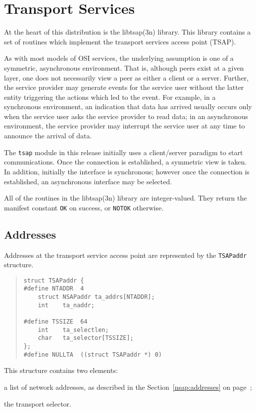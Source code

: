 
\chapter	{Transport Services}\label{libtsap}
At the heart of this distribution is the \man libtsap(3n) library.
This library contains a set of routines which implement the
transport services access point (TSAP).

As with most models of OSI services,
the underlying assumption is one of a symmetric, asynchronous environment.
That is,
although peers exist at a given layer, one does not necessarily view a peer as
either a client or a server.
Further,
the service provider may generate events for the service user without the
latter entity triggering the actions which led to the event.
For example,
in a synchronous environment,
an indication that data has arrived usually occurs only when the service user
asks the service provider to read data;
in an asynchronous environment,
the service provider may interrupt the service user at any time to announce
the arrival of data.

The \verb"tsap" module in this release initially uses a client/server
paradigm to start communications.
Once the connection is established,
a symmetric view is taken.
In addition,
initially the interface is synchronous;
however once the connection is established,
an asynchronous interface may be selected.

All of the routines in the \man libtsap(3n) library are integer-valued.
They return the manifest constant \verb"OK" on success,
or \verb"NOTOK" otherwise.

\section	{Addresses}\label{tsap:addresses}
Addresses at the transport service access point are represented by the
\verb"TSAPaddr" structure.
\begin{quote}\small\begin{verbatim}
struct TSAPaddr {
#define NTADDR  4
    struct NSAPaddr ta_addrs[NTADDR];
    int    ta_naddr;

#define TSSIZE  64
    int    ta_selectlen;
    char   ta_selector[TSSIZE];
};
#define NULLTA  ((struct TSAPaddr *) 0)
\end{verbatim}\end{quote}
This structure contains two elements:
\begin{describe}
\item[\verb"ta\_addrs"/\verb"ta\_nadr":] a list of network addresses,
as described in the Section~\ref{nsap:addresses} on
page~\pageref{nsap:addresses};

\item[\verb"ta\_selector"/\verb"ta\_selectlen":] the transport selector.
\end{describe}

